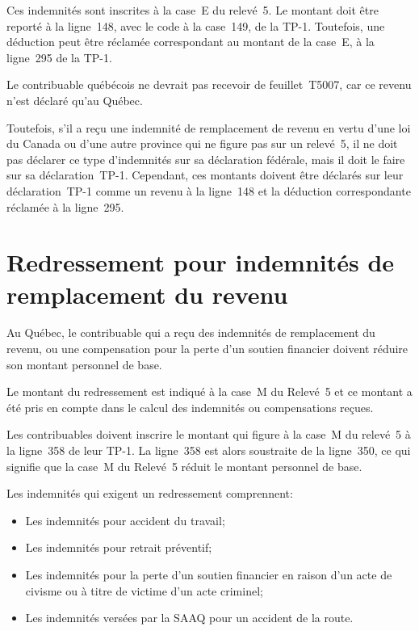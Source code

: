 Ces indemnités sont inscrites à la case~E du relevé~5. Le montant doit être reporté à la ligne~148, avec le code  \fg{} à la case~149, de la TP-1.
Toutefois, une déduction peut être réclamée correspondant au montant de la case~E, à la ligne~295 de la TP-1.

Le contribuable québécois ne devrait pas recevoir de feuillet~T5007, car ce revenu n'est déclaré qu'au Québec. 

Toutefois, s'il a reçu une indemnité de remplacement de revenu en vertu d'une loi du Canada ou d'une autre province qui ne figure pas sur un relevé~5, il ne doit pas déclarer ce type d'indemnités sur sa déclaration fédérale, mais il doit le faire sur sa déclaration~TP-1. Cependant, ces montants doivent être déclarés sur leur déclaration~TP-1 comme un revenu à la ligne~148 et la déduction correspondante réclamée à la ligne~295.


\section{Redressement pour indemnités de remplacement du revenu}
\begin{intro}
	Au Québec, le contribuable qui a reçu des indemnités de remplacement du revenu, ou une compensation pour la perte d'un soutien financier doivent réduire son montant personnel de base.
\end{intro}



Le montant du redressement est indiqué à la case~M du Relevé~5 et ce montant a été pris en compte dans le calcul des indemnités ou compensations reçues.

Les contribuables doivent inscrire le montant qui figure à la case~M du relevé~5 à la ligne~358 de leur TP-1. La ligne~358 est alors soustraite de la ligne~350, ce qui signifie que la case~M du Relevé~5 réduit le montant personnel de base.

Les indemnités qui exigent un redressement comprennent:
\begin{itemize}
	\item Les indemnités pour accident du travail;
	\item Les indemnités pour retrait préventif;
	\item Les indemnités pour la perte d'un soutien financier en raison d'un acte de civisme ou à titre de victime d'un acte criminel;
	\item Les indemnités versées par la SAAQ pour un accident de la route.
\end{itemize}

